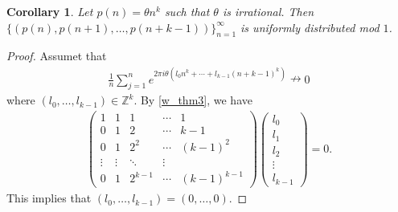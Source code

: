 \documentclass[a4paper,10pt]{amsart}
\newtheorem{corollary}{Corollary}[section]
\newcommand{\Z}{\mathbb Z} %
\begin{document}
\begin{corollary} \label{w_cor2}
    Let $p(n) = \theta n^{k}$
    such that $\theta$ is irrational.
    Then $\{(p(n), p(n+1), \ldots, p(n+k-1))\}_{n=1}^{\infty}$ is
    uniformly distributed mod $1$. 
\end{corollary}

\begin{proof}
    Assumet that
    \begin{align*}
        \frac{1}{n} \sum^{n}_{j=1} 
        e^{2\pi i \theta(l_0 n^{k} + \cdots + l_{k-1}(n+k-1)^k)} 
        \nrightarrow 0 
    \end{align*}
    where $(l_0, \ldots, l_{k-1}) \in \Z^{k}$. By \cref{w_thm3}, we have
    \begin{align*}
       \begin{pmatrix}
           1 & 1 & 1 & \cdots & 1 \\
           0 & 1 & 2 & \cdots & k-1 \\
           0 & 1 & 2^{2} & \cdots & (k-1)^2 \\
           \vdots & \vdots & \ddots & \vdots \\
           0 & 1 & 2^{k-1} & \cdots & (k-1)^{k-1}
       \end{pmatrix} 
       \begin{pmatrix}
          l_0 \\
          l_1 \\
          l_2 \\
          \vdots \\
          l_{k-1}
       \end{pmatrix} = 0.
    \end{align*}
    This implies that $(l_0, \ldots, l_{k-1}) = (0, \ldots, 0)$. 
\end{proof}
\end{document}
